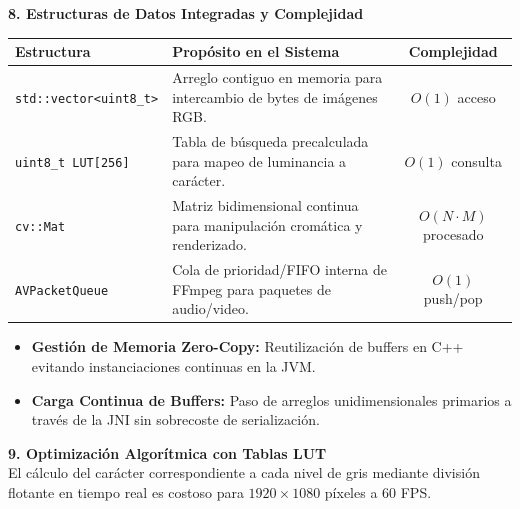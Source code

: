 \documentclass[12pt]{article}
\begin{document}
\newpage

{\Huge \bfseries 8. Estructuras de Datos Integradas y Complejidad}\\[0.8cm]

\Large
\begin{table}[h!]
\centering
\begin{tabularx}{\textwidth}{l X c}
\toprule
\textbf{Estructura} & \textbf{Propósito en el Sistema} & \textbf{Complejidad} \\
\midrule
\texttt{std::vector<uint8\_t>} & Arreglo contiguo en memoria para intercambio de bytes de imágenes RGB. & $O(1)$ acceso \\
\texttt{uint8\_t LUT[256]} & Tabla de búsqueda precalculada para mapeo de luminancia a carácter. & $O(1)$ consulta \\
\texttt{cv::Mat} & Matriz bidimensional continua para manipulación cromática y renderizado. & $O(N \cdot M)$ procesado \\
\texttt{AVPacketQueue} & Cola de prioridad/FIFO interna de FFmpeg para paquetes de audio/video. & $O(1)$ push/pop \\
\bottomrule
\end{tabularx}
\end{table}

\vspace{0.5cm}
\begin{itemize}
    \item \textbf{Gestión de Memoria Zero-Copy:} Reutilización de buffers en C++ evitando instanciaciones continuas en la JVM.
    \item \textbf{Carga Continua de Buffers:} Paso de arreglos unidimensionales primarios a través de la JNI sin sobrecoste de serialización.
\end{itemize}

\newpage

{\Huge \bfseries 9. Optimización Algorítmica con Tablas LUT}\\[0.8cm]

\Large
El cálculo del carácter correspondiente a cada nivel de gris mediante división flotante en tiempo real es costoso para $1920 \times 1080$ píxeles a 60 FPS.
\end{document}
